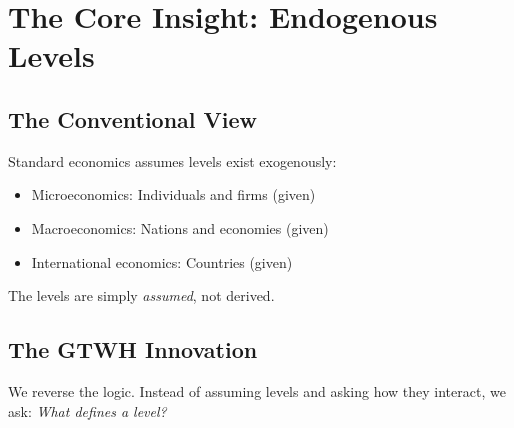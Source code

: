 \documentclass[12pt,a4paper]{article}
\begin{document}
\section{The Core Insight: Endogenous Levels}
\label{sec:core-insight}

\subsection{The Conventional View}

Standard economics assumes levels exist exogenously:
\begin{itemize}[nosep]
\item Microeconomics: Individuals and firms (given)
\item Macroeconomics: Nations and economies (given)
\item International economics: Countries (given)
\end{itemize}

The levels are simply \textit{assumed}, not derived.

\subsection{The GTWH Innovation}

We reverse the logic. Instead of assuming levels and asking how they interact, 
we ask: \textit{What defines a level?}
\end{document}
